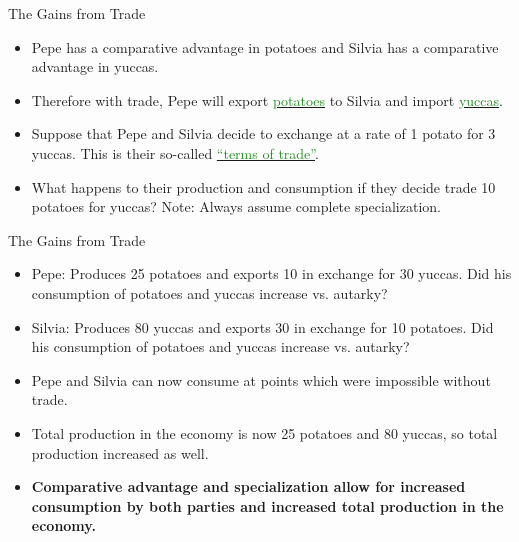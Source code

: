 \documentclass[xcolor={dvipsnames},pdf, hyperref={colorlinks=true, citecolor=ForestGreen, linkcolor=BlueViolet, urlcolor=Magenta}]{beamer}
\theoremstyle{definition}
\newcommand{\dd}[1]{{\underline{\textcolor{ForestGreen}{#1}}}}
\begin{document}
\begin{frame}{The Gains from Trade}
	
\begin{itemize}
	\item 	Pepe has a comparative advantage in potatoes and Silvia has a comparative advantage in yuccas. 
	\item Therefore with trade, Pepe will export \dd{potatoes} to Silvia and import \dd{yuccas}. 
	\item Suppose that Pepe and Silvia decide to exchange at a rate of 1 potato for 3 yuccas. This is their so-called \dd{``terms of trade''}.
	\item What happens to their production and consumption if they decide trade 10 potatoes for yuccas? Note: Always assume complete specialization.
\end{itemize}
	
\end{frame}

\begin{frame}{The Gains from Trade}
	\begin{itemize}
		\item Pepe: Produces 25 potatoes and exports 10 in exchange for 30 yuccas. Did his consumption of potatoes and yuccas increase vs. autarky?
		\item Silvia: Produces 80 yuccas and exports 30 in exchange for 10 potatoes. Did his consumption of potatoes and yuccas increase vs. autarky?
		
		
		\item Pepe  and Silvia can now consume at points which were impossible without trade. 
		\item Total production in the economy is now 25 potatoes and 80 yuccas, so total production increased as well.
		\item \textbf{Comparative advantage and specialization allow for increased consumption by \textbf{both} parties and increased total production in the economy.}
	\end{itemize}
\end{frame}
\end{document}
